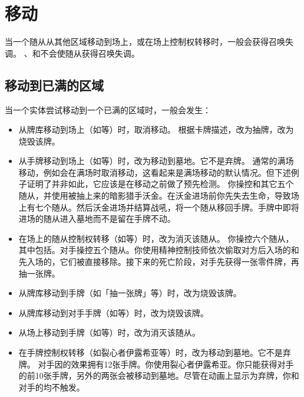 \section{移动}
\label{move}

当一个随从从其他区域移动到场上，或在场上控制权转移时，一般会获得召唤失调。
\exception {}、和不会使随从获得召唤失调。

\subsection{移动到已满的区域}
\label{move-to-full-zone}

当一个实体尝试移动到一个已满的区域时，一般会发生：

\begin{itemize}
    \item 从牌库移动到场上（如等）时，取消移动。
        \exception 根据卡牌描述，改为抽牌，改为烧毁该牌。
    \item 从手牌移动到场上（如等）时，改为移动到墓地。它不是弃牌。
        \notice 通常的满场移动，例如会在满场时取消移动，这看起来是满场移动的默认情况。但下述例子证明了并非如此，它应该是在移动之前做了预先检测。
        \example 你操控和其它五个随从，并使用被抽上来的暗影猎手沃金。在沃金进场前你先失去生命，导致场上有七个随从。然后沃金进场并结算战吼，将一个随从移回手牌。手牌中即将进场的随从进入墓地而不是留在手牌不动。
    \item 在场上的随从控制权转移（如等）时，改为消灭该随从。
    \example 你操控六个随从，其中包括。对手操控五个随从。你使用精神控制技师依次偷取对方后入场的和先入场的，它们被直接移除。接下来的死亡阶段，对手先获得一张零件牌，再抽一张牌。
\end{itemize}

\begin{itemize}
    \item 从牌库移动到手牌（如「抽一张牌」等）时，改为烧毁该牌。
    \item 从牌库移动到对手手牌（如等）时，改为烧毁该牌。
    \item 从场上移动到手牌（如等）时，改为消灭该随从。
    \item 在手牌控制权转移（如裂心者伊露希亚等）时，改为移动到墓地。它不是弃牌。
        \example 对手因的效果拥有12张手牌。你使用裂心者伊露希亚。你只能获得对手的前10张手牌，另外的两张会被移动到墓地。尽管在动画上显示为弃牌，你和对手的均不触发。
\end{itemize}

